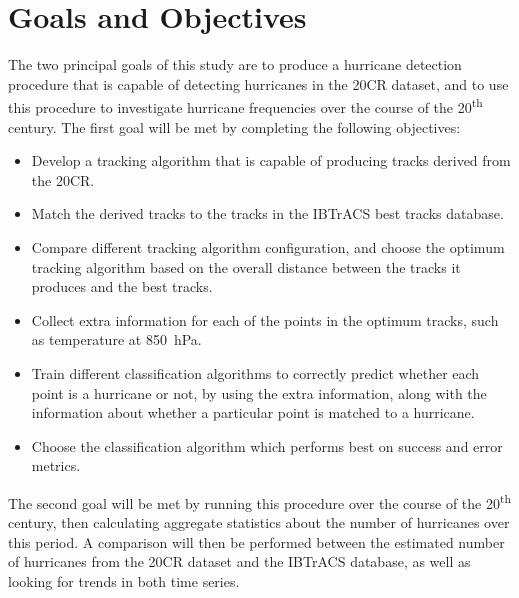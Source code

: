 \documentclass[pdftex,12pt,a4paper]{report}
\newcommand{\ts}{\textsuperscript}
\begin{document}

\section{Goals and Objectives}

The two principal goals of this study are to produce a hurricane detection procedure that is capable
of detecting hurricanes in the 20CR dataset, and to use this procedure to investigate hurricane
frequencies over the course of the 20\ts{th} century. The first goal will be met by completing the
following objectives:

\begin{itemize}
    \item Develop a tracking algorithm that is capable of producing tracks derived from the 20CR.
    \item Match the derived tracks to the tracks in the IBTrACS best tracks database.
    \item Compare different tracking algorithm configuration, and choose the optimum tracking
        algorithm based on the overall distance between the tracks it produces and the best tracks.
    \item Collect extra information for each of the points in the optimum tracks, such as
        temperature at \SI{850}{hPa}.
    \item Train different classification algorithms to correctly predict whether each point is a
        hurricane or not, by using the extra information, along with the information about whether a
        particular point is matched to a hurricane.
    \item Choose the classification algorithm which performs best on success and error metrics.
\end{itemize}

The second goal will be met by running this procedure over the course of the 20\ts{th} century, then
calculating aggregate statistics about the number of hurricanes over this period. A comparison
will then be performed between the estimated number of hurricanes from the 20CR dataset and the
IBTrACS database, as well as looking for trends in both time series.
\end{document}

